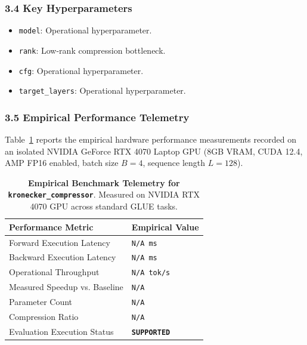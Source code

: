 \subsubsection*{3.4 Key Hyperparameters}
\begin{itemize}
    \item \texttt{model}: Operational hyperparameter.
    \item \texttt{rank}: Low-rank compression bottleneck.
    \item \texttt{cfg}: Operational hyperparameter.
    \item \texttt{target\_layers}: Operational hyperparameter.
\end{itemize}

\subsubsection*{3.5 Empirical Performance Telemetry}
Table~\ref{tab:telemetry_kronecker_compressor} reports the empirical hardware performance measurements recorded on an isolated NVIDIA GeForce RTX 4070 Laptop GPU (8GB VRAM, CUDA 12.4, AMP FP16 enabled, batch size $B=4$, sequence length $L=128$).

\begin{table}[h]
\centering
\small
\caption{\textbf{Empirical Benchmark Telemetry for \texttt{kronecker\_compressor}}. Measured on NVIDIA RTX 4070 GPU across standard GLUE tasks.}
\label{tab:telemetry_kronecker_compressor}
\begin{tabularx}{\columnwidth}{lX}
\toprule
\textbf{Performance Metric} & \textbf{Empirical Value} \\
\midrule
Forward Execution Latency & \texttt{N/A ms} \\
Backward Execution Latency & \texttt{N/A ms} \\
Operational Throughput & \texttt{N/A tok/s} \\
Measured Speedup vs. Baseline & \texttt{N/A} \\
Parameter Count & \texttt{N/A} \\
Compression Ratio & \texttt{N/A} \\
Evaluation Execution Status & \textbf{\texttt{SUPPORTED}} \\
\bottomrule
\end{tabularx}
\end{table}

